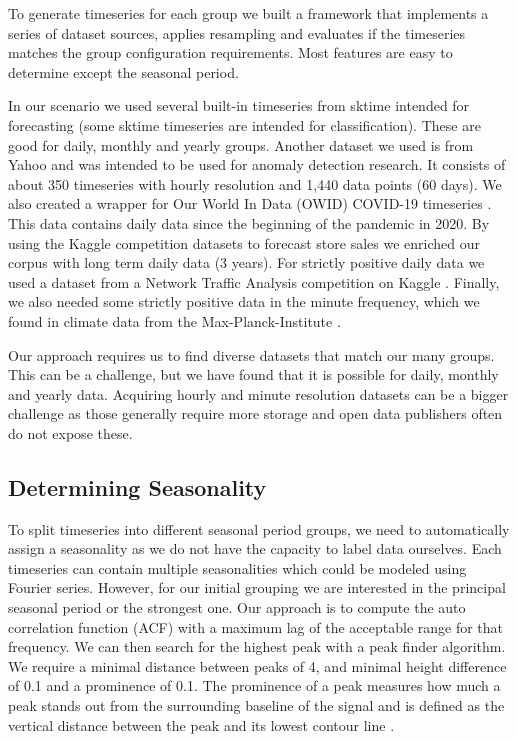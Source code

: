 To generate timeseries for each group we built a framework that implements a series of dataset sources, applies resampling and evaluates if the timeseries matches the group configuration requirements. Most features are easy to determine except the seasonal period.

In our scenario we used several built-in timeseries from sktime \cite{sktime} intended for forecasting (some sktime timeseries are intended for classification). These are good for daily, monthly and yearly groups. Another dataset we used is from Yahoo \cite{yahoo-dataset} and was intended to be used for anomaly detection research. It consists of about 350 timeseries with hourly resolution and 1,440 data points (60 days). We also created a wrapper for Our World In Data (OWID) COVID-19 timeseries \cite{OWID-COVID}. This data contains daily data since the beginning of the pandemic in 2020. By using the Kaggle competition datasets to forecast store sales \cite{STORE_SALES_COMPETITION} we enriched our corpus with long term daily data (3 years). For strictly positive daily data we used a dataset from a Network Traffic Analysis competition on Kaggle \cite{NETWORK_TRAFFIC_COMPETITION}. Finally, we also needed some strictly positive data in the minute frequency, which we found in climate data from the Max-Planck-Institute \cite{CLIMATE_DATASET}.

Our approach requires us to find diverse datasets that match our many groups. This can be a challenge, but we have found that it is possible for daily, monthly and yearly data. Acquiring hourly and minute resolution datasets can be a bigger challenge as those generally require more storage and open data publishers often do not expose these.

\subsection{Determining Seasonality}

To split timeseries into different seasonal period groups, we need to automatically assign a seasonality as we do not have the capacity to label data ourselves. Each timeseries can contain multiple seasonalities which could be modeled using Fourier series. However, for our initial grouping we are interested in the principal seasonal period or the strongest one. 
Our approach is to compute the auto correlation function (ACF) with a maximum lag of the acceptable range for that frequency. We can then search for the highest peak with a peak finder algorithm. We require a minimal distance between peaks of 4, and minimal height difference of 0.1 and a prominence of 0.1. The prominence of a peak measures how much a peak stands out from the surrounding baseline of the signal and is defined as the vertical distance between the peak and its lowest contour line \cite{scipy}.


